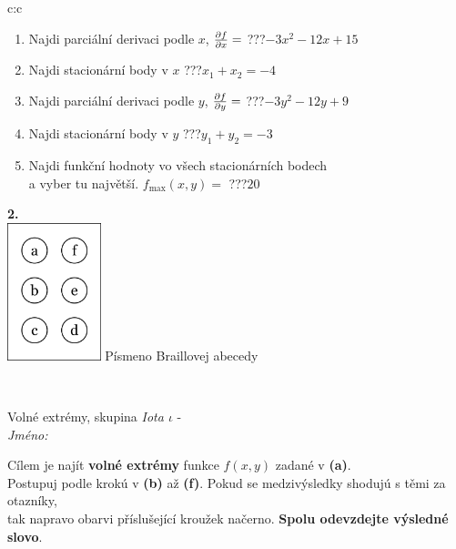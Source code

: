\documentclass[10pt]{report}
\begin{document}
\begin{tabular}{c:c}
\begin{minipage}[c][104.5mm][t]{0.5\linewidth}
\begin{center}
\begin{minipage}{0.79\linewidth}
\begin{center}
\begin{varwidth}{\linewidth}
\begin{enumerate}
\item Najdi parciální derivaci podle $x$, $\pdv{f}{x}=$\quad \dotfill\; ???\;\dotfill \quad $-3x^2-12x+15$
\item Najdi stacionární body v $x$\quad \dotfill\; ???\;\dotfill \quad $x_1+x_2=-4$
\item Najdi parciální derivaci podle $y$, $\pdv{f}{y}=$\quad \dotfill\; ???\;\dotfill \quad $-3y^2-12y+9$
\item Najdi stacionární body v $y$\quad \dotfill\; ???\;\dotfill \quad $y_1+y_2=-3$
\item Najdi funkční hodnoty vo všech stacionárních bodech \\ \phantom{xxxxxx} a vyber tu najvětší. $f_{\text{max}}(x,y)=$\quad \dotfill\; ???\;\dotfill \quad $20$
\end{enumerate}
\end{varwidth}
\end{center}
\end{minipage}
\begin{minipage}{0.20\linewidth}
\begin{center}
{\Huge\bfseries 2.} \\[2mm]
\includegraphics[height=40mm]{../images/braille.png}
{\small Písmeno Braillovej abecedy}
\end{center}
\end{minipage}
\end{center}
\end{minipage}
\\ \hdashline
\begin{minipage}[c][104.5mm][t]{0.5\linewidth}
\begin{center}
\vspace{7mm}
{\huge Volné extrémy, skupina \textit{Iota $\iota$} -}\\[5mm]
\textit{Jméno:}\phantom{xxxxxxxxxxxxxxxxxxxxxxxxxxxxxxxxxxxxxxxxxxxxxxxxxxxxxxxxxxxxxxxxx}\\[5mm]
\begin{minipage}{0.95\linewidth}
\begin{center}
Cílem je najít \textbf{volné extrémy} funkce $f(x,y)$ zadané v \textbf{(a)}.\\Postupuj podle krokú v \textbf{(b)} až \textbf{(f)}. Pokud se medzivýsledky shodujú s těmi za otazníky,\\tak napravo obarvi příslušející kroužek načerno. \textbf{Spolu odevzdejte výsledné slovo}.

\end{center}
\end{minipage}
\end{center}
\end{minipage}
\end{tabular}
\end{document}
